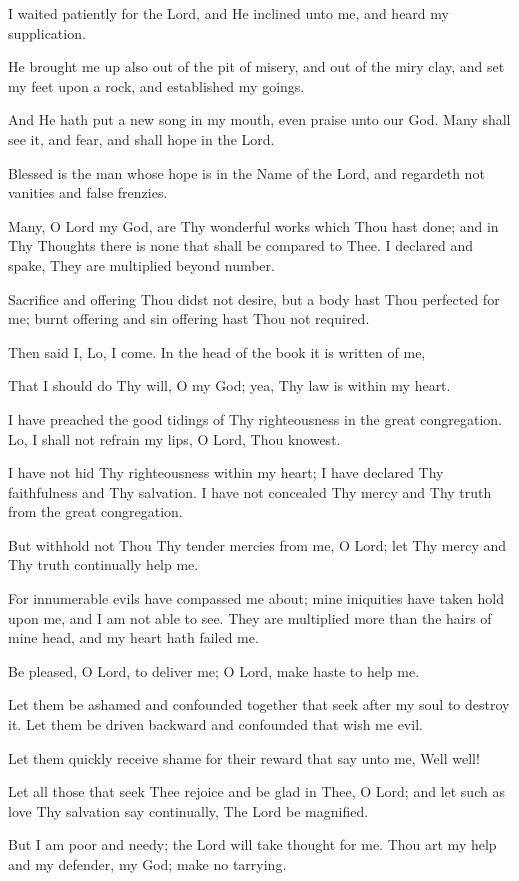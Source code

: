 I waited patiently for the Lord, and He inclined unto me, and heard my supplication.

He brought me up also out of the pit of misery, and out of the miry clay, and set my feet upon a rock, and established my goings.

And He hath put a new song in my mouth, even praise unto our God. Many shall see it, and fear, and shall hope in the Lord.

Blessed is the man whose hope is in the Name of the Lord, and regardeth not vanities and false frenzies.

Many, O Lord my God, are Thy wonderful works which Thou hast done; and in Thy Thoughts there is none that shall be compared to Thee. I declared and spake, They are multiplied beyond number.

Sacrifice and offering Thou didst not desire, but a body hast Thou perfected for me; burnt offering and sin offering hast Thou not required.

Then said I, Lo, I come. In the head of the book it is written of me,

That I should do Thy will, O my God; yea, Thy law is within my heart.

I have preached the good tidings of Thy righteousness in the great congregation. Lo, I shall not refrain my lips, O Lord, Thou knowest.

I have not hid Thy righteousness within my heart; I have declared Thy faithfulness and Thy salvation. I have not concealed Thy mercy and Thy truth from the great congregation.

But withhold not Thou Thy tender mercies from me, O Lord; let Thy mercy and Thy truth continually help me.

For innumerable evils have compassed me about; mine iniquities have taken hold upon me, and I am not able to see. They are multiplied more than the hairs of mine head, and my heart hath failed me.

Be pleased, O Lord, to deliver me; O Lord, make haste to help me.

Let them be ashamed and confounded together that seek after my soul to destroy it. Let them be driven backward and confounded that wish me evil.

Let them quickly receive shame for their reward that say unto me, Well well!

Let all those that seek Thee rejoice and be glad in Thee, O Lord; and let such as love Thy salvation say continually, The Lord be magnified.

But I am poor and needy; the Lord will take thought for me. Thou art my help and my defender, my God; make no tarrying.
